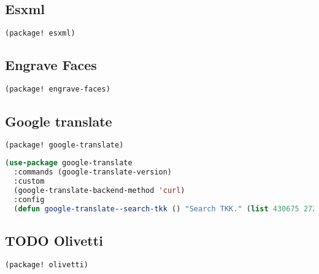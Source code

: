 \documentclass[11pt]{article}
\begin{document}
\subsection{Esxml}
\label{sec:esxml}
\begin{lstlisting}[language=Lisp]
(package! esxml)
\end{lstlisting}

\subsection{Engrave Faces}
\label{sec:engrave-faces}
\begin{lstlisting}[language=Lisp]
(package! engrave-faces)
\end{lstlisting}

\subsection{Google translate}
\label{sec:google-translate}
\begin{lstlisting}[language=Lisp]
(package! google-translate)
\end{lstlisting}

\begin{lstlisting}[language=Lisp]
(use-package google-translate
  :commands (google-translate-version)
  :custom
  (google-translate-backend-method 'curl)
  :config
  (defun google-translate--search-tkk () "Search TKK." (list 430675 2721866130)))
\end{lstlisting}

\subsection{{\bfseries\sffamily TODO} Olivetti}
\label{sec:olivetti}
\begin{lstlisting}[language=Lisp]
(package! olivetti)
\end{lstlisting}
\end{document}
